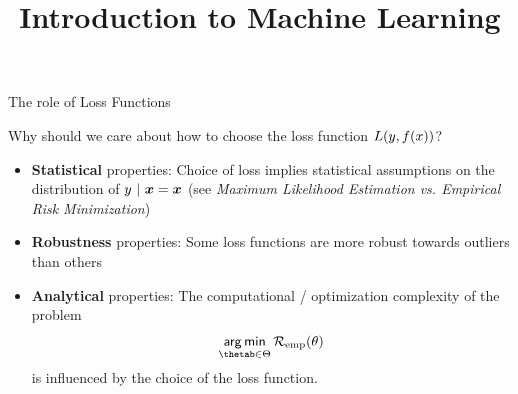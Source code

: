 





\usepackage{booktabs}

\newcommand{\titlefigure}{figure/robustness.png}
\newcommand{\learninggoals}{
  \item Know the concept of robustness 
  \item Learn about analytical and computational properties of loss functions 
}

\title{Introduction to Machine Learning}
\date{}





\begin{vbframe}{The role of Loss Functions}

Why should we care about how to choose the loss function $L(y, f(x))$?

\begin{itemize}
\item \textbf{Statistical} properties: Choice of loss implies statistical assumptions on the distribution of $y ~|~ \bm{x} = \bm{x}$ (see \emph{Maximum Likelihood Estimation vs.
Empirical Risk Minimization})
\item \textbf{Robustness} properties: Some loss functions are more robust towards outliers than others
\item \textbf{Analytical} properties: The computational / optimization complexity of the problem
$$
\argmin_{\thetab \in \Theta} \risket
$$
is influenced by the choice of the loss function. 
\end{itemize}

\end{vbframe}



